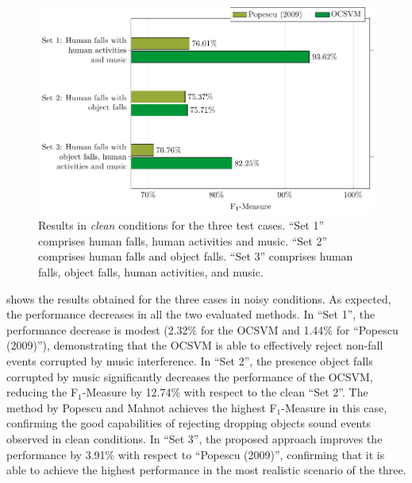 \begin{figure}[htb]
	\centering
	\includegraphics[width=\columnwidth]{img/cin_only_ocsv/res_clean.pdf}
	\caption{Results in \textit{clean} conditions for the three test cases. ``Set 1'' comprises human falls, human activities and music. ``Set 2'' comprises human falls and object falls. ``Set 3'' comprises human falls, object falls, human activities, and music.} \label{fig:res_clean}
\end{figure}

 shows the results obtained for the three cases in noisy conditions. As expected, the performance decreases in all the two evaluated methods. In ``Set 1'', the performance decrease is modest (2.32\% for the OCSVM and 1.44\% for ``Popescu (2009)''), demonstrating that the OCSVM is able to effectively reject non-fall events corrupted by music interference. In ``Set 2'', the presence object falls corrupted by music significantly decreases the performance of the OCSVM, reducing the F$_1$-Measure by 12.74\% with respect to the clean ``Set 2''. The method by Popescu and Mahnot \cite{Popescu2009} achieves the highest F$_1$-Measure in this case, confirming the good capabilities of rejecting dropping objects sound events observed in clean conditions. In ``Set 3'', the proposed approach improves the performance by 3.91\% with respect to ``Popescu (2009)'', confirming that it is able to achieve the highest performance in the most realistic scenario of the three.


